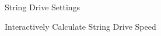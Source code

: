 \documentclass[10pt,letterpaper,titlepage]{article}
\begin{document}
    \begin{figure}[hb]
        \centering
        \caption{String Drive Settings}
        \label{fig:string_drive_settings}
    \end{figure}
    \begin{figure}[hb]
        \centering
        \caption{Interactively Calculate String Drive Speed}
        \label{fig:string_drive_speed}
    \end{figure}
    \FloatBarrier
\end{document}
